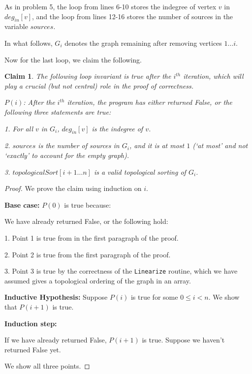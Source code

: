 \documentclass[answers]{exam}
\newtheorem*{claim}{Claim}
\begin{document}
\begin{questions}
\begin{solution}
As in problem 5, the loop from lines 6-10 stores the indegree of vertex $v$ in $deg_{in}[v]$, and the loop from lines 12-16 stores the number of sources in the variable $sources$.

In what follows, $G_i$ denotes the graph remaining after removing vertices $1\dots i$.

Now for the last loop, we claim the following.

\begin{claim}
The following loop invariant is true after the $i^{th}$ iteration, which will play a crucial (but not central) role in the proof of correctness.

$P(i)$: After the $i^{th}$ iteration, the program has either returned False, or the following three statements are true:

1. For all $v$ in $G_i$, $deg_{in}[v]$ is the indegree of $v$.

2. $sources$ is the number of sources in $G_i$, and it is at most $1$ (`at most' and not `exactly' to account for the empty graph).

3. $topologicalSort[i + 1 \dots n]$ is a valid topological sorting of $G_i$.
\end{claim}

\begin{proof} We prove the claim using induction on $i$.

\textbf{Base case:} $P(0)$ is true because:

We have already returned False, or the following hold:

1. Point 1 is true from in the first paragraph of the proof.

2. Point 2 is true from the first paragraph of the proof.

3. Point 3 is true by the correctness of the \texttt{Linearize} routine, which we have assumed gives a topological ordering of the graph in an array.

\textbf{Inductive Hypothesis:} Suppose $P(i)$ is true for some $0 \le i < n$. We show that $P(i + 1)$ is true. 

\textbf{Induction step:} 

If we have already returned False, $P(i + 1)$ is true. Suppose we haven't returned False yet.

We show all three points.


\end{proof}
\end{solution}
\end{questions}
\end{document}
